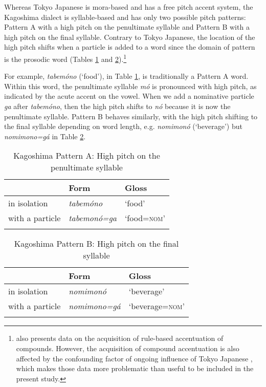 \documentclass[output=paper,colorlinks,citecolor=brown]{langscibook}
\begin{document}
Whereas Tokyo Japanese is mora-based and has a free pitch accent system, the Kagoshima dialect is syllable-based and has only two possible pitch patterns: Pattern A with a high pitch on the penultimate syllable and Pattern B with a high pitch on the final syllable. Contrary to Tokyo Japanese, the location of the high pitch shifts when a particle is added to a word since the domain of pattern is the prosodic word (Tables \ref{tab:tabemono} and \ref{tab:nomimono}).\footnote{\citet{Takemura2012} also presents data on the acquisition of rule-based accentuation of compounds. However, the acquisition of compound accentuation is also affected by the confounding factor of ongoing influence of Tokyo Japanese \citep{Kubozono2006}, which makes those data more problematic than useful to be included in the present study.}

For example, \emph{tabemóno} (`food'), in Table \ref{tab:tabemono}, is traditionally a Pattern A word. Within this word, the penultimate syllable \emph{mó} is pronounced with high pitch, as indicated by the acute accent on the vowel. When we add a nominative particle \emph{ga} after \emph{tabemóno}, then the high pitch shifts to \emph{nó} because it is now the penultimate syllable. Pattern B behaves similarly, with the high pitch shifting to the final syllable depending on word length, e.g. \emph{nomimonó} (`beverage') but \emph{nomimono=gá} in Table \ref{tab:nomimono}.

\begin{table}
\centering
\caption{Kagoshima Pattern A: High pitch on the penultimate syllable}
\label{tab:tabemono}
\begin{tabular}{lll}
\lsptoprule
                & Form            & Gloss      \\\midrule
in isolation    & \textit{tabemóno}    & `food'     \\
with a particle & \textit{tabemonó=ga} & `food=\textsc{nom}' \\
\lspbottomrule
\end{tabular}
\end{table}

\begin{table}
\centering
\caption{Kagoshima Pattern B: High pitch on the final syllable}
\label{tab:nomimono}
\begin{tabular}{lll}
\lsptoprule
                & Form            & Gloss      \\\midrule
in isolation    & \textit{nomimonó}    & `beverage'     \\
with a particle & \textit{nomimono=gá} & `beverage=\textsc{nom}' \\
\lspbottomrule
\end{tabular}
\end{table}
\end{document}
